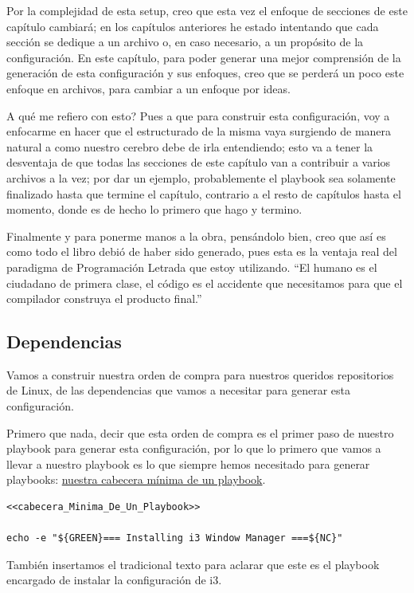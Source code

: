 \documentclass[11pt]{article}
\begin{document}
Por la complejidad de esta setup, creo que esta vez el enfoque de secciones de este capítulo cambiará; en los capítulos anteriores he estado intentando que cada sección se dedique a un archivo o, en caso necesario, a un propósito de la configuración. En este capítulo, para poder generar una mejor comprensión de la generación de esta configuración y sus enfoques, creo que se perderá un poco este enfoque en archivos, para cambiar a un enfoque por ideas.

A qué me refiero con esto? Pues a que para construir esta configuración, voy a enfocarme en hacer que el estructurado de la misma vaya surgiendo de manera natural a como nuestro cerebro debe de irla entendiendo; esto va a tener la desventaja de que todas las secciones de este capítulo van a contribuir a varios archivos a la vez; por dar un ejemplo, probablemente el playbook sea solamente finalizado hasta que termine el capítulo, contrario a el resto de capítulos hasta el momento, donde es de hecho lo primero que hago y termino.

Finalmente y para ponerme manos a la obra, pensándolo bien, creo que así es como todo el libro debió de haber sido generado, pues esta es la ventaja real del paradigma de Programación Letrada que estoy utilizando. ``El humano es el ciudadano de primera clase, el código es el accidente que necesitamos para que el compilador construya el producto final.''
\subsection{Dependencias}
\label{sec:orgd831bf4}

Vamos a construir nuestra orden de compra para nuestros queridos repositorios de Linux, de las dependencias que vamos a necesitar para generar esta configuración.

Primero que nada, decir que esta orden de compra es el primer paso de nuestro playbook para generar esta configuración, por lo que lo primero que vamos a llevar a nuestro playbook es lo que siempre hemos necesitado para generar playbooks: \hyperref[sec:org81af12a]{nuestra cabecera mínima de un playbook}.

\begin{verbatim}
<<cabecera_Minima_De_Un_Playbook>>

echo -e "${GREEN}=== Installing i3 Window Manager ===${NC}"

\end{verbatim}

También insertamos el tradicional texto para aclarar que este es el playbook encargado de instalar la configuración de i3.
\end{document}
